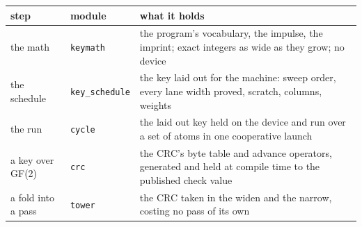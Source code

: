 {\small
\setlength{\tabcolsep}{6pt}
\begin{longtable}{>{\RaggedRight\arraybackslash}p{}>{\RaggedRight\arraybackslash}p{}>{\RaggedRight\arraybackslash}p{}}
\toprule
step & module & what it holds \\
\midrule
\endhead
the math & \texttt{keymath} & the program's vocabulary, the impulse, the imprint; exact integers as wide as they grow; no device \\
the schedule & \texttt{key\_\allowbreak{}schedule} & the key laid out for the machine: sweep order, every lane width proved, scratch, columns, weights \\
the run & \texttt{cycle} & the laid out key held on the device and run over a set of atoms in one cooperative launch \\
a key over GF(2) & \texttt{crc} & the CRC's byte table and advance operators, generated and held at compile time to the published check value \\
a fold into a pass & \texttt{tower} & the CRC taken in the widen and the narrow, costing no pass of its own \\
\bottomrule
\end{longtable}
}
